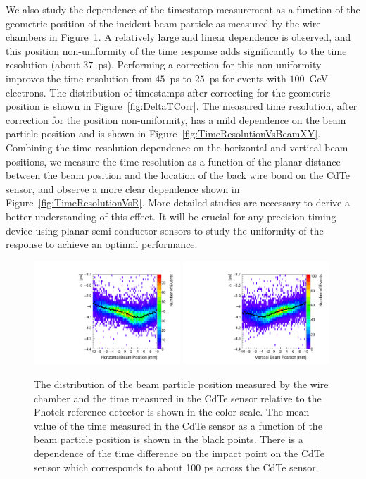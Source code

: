 We also study the dependence of the timestamp measurement as a function of the geometric
position of the incident beam particle as measured by the wire chambers in 
Figure~\ref{fig:DeltaTVsBeamXY}. A relatively large and linear dependence is observed, 
and this position non-uniformity of the time response adds significantly to the 
time resolution (about $37$~ps). Performing a correction for this non-uniformity improves
the time resolution from $45$~ps to $25$~ps for events with $100$~GeV electrons.
The distribution of timestamps after correcting for the geometric position is shown
in Figure~\ref{fig:DeltaTCorr}. The measured time resolution, after correction for
the position non-uniformity, has a mild dependence on the beam particle position 
and is shown in Figure~\ref{fig:TimeResolutionVsBeamXY}. Combining the time resolution
dependence on the horizontal and vertical beam positions, we measure the time resolution
as a function of the planar distance between the beam position and the location of the 
back wire bond on the CdTe sensor, and observe a more clear dependence shown in 
Figure~\ref{fig:TimeResolutionVsR}. More detailed studies are necessary
to derive a better understanding of this effect. It will be crucial for any precision timing device
using planar semi-conductor sensors to study the uniformity of the response to achieve an optimal performance.
%
\begin{figure}[htbp] 
\centering
\includegraphics[width=0.49\textwidth]{figures/DeltaTVsHorizontalPosition.pdf} 
\includegraphics[width=0.49\textwidth]{figures/DeltaTVsVerticalPosition.pdf} 
\caption{ The distribution of the beam particle position measured by the wire chamber
and the time measured in the CdTe sensor relative to the Photek reference detector
is shown in the color scale. The mean value of the time measured in the CdTe sensor as a function
of the beam particle position is shown in the black points. There is a dependence of the time difference
on the impact point on the CdTe sensor which corresponds to about 100 ps across the CdTe sensor.} 
\label{fig:DeltaTVsBeamXY} 
\end{figure} 

